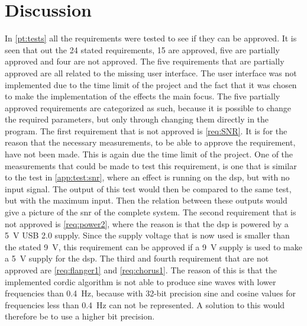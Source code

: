 \section{Discussion}\label{sec:discussion}

In \autoref{pt:tests} all the requirements were tested to see if they can be approved. It is seen that out the 24 stated requirements, 15 are approved, five are partially approved and four are not approved. 
The five requirements that are partially approved are all related to the missing user interface. The user interface was not implemented due to the time limit of the project and the fact that it was chosen to make the implementation of the effects the main focus. The five partially approved requirements are categorized as such, because it is possible to change the required parameters, but only through changing them directly in the program. The first requirement that is not approved is \autoref{req:SNR}. It is for the reason that the necessary measurements, to be able to approve the requirement, have not been made. This is again due the time limit of the project. One of the measurements that could be made to test this requirement, is one that is similar to the test in \autoref{app:test:snr}, where an effect is running on the \gls{dsp}, but with no input signal. The output of this test would then be compared to the same test, but with the maximum input. Then the relation between these outputs would give a picture of the \gls{snr} of the complete system.
The second requirement that is not approved is \autoref{req:power2}, where the reason is that the \gls{dsp} is powered by a \SI{5}{\volt} USB 2.0 supply. Since the supply voltage that is now used is smaller than the stated \SI{9}{\volt}, this requirement can be approved if a \SI{9}{\volt} supply is used to make a \SI{5}{\volt} supply for the \gls{dsp}.
The third and fourth requirement that are not approved are \autoref{req:flanger1} and \autoref{req:chorus1}. The reason of this is that the implemented \gls{cordic} algorithm is not able to produce sine waves with lower frequencies than \SI{0.4}{\hertz}, because with 32-bit precision sine and cosine values for frequencies less than \SI{0.4}{\hertz} can not be represented. A solution to this would therefore be to use a higher bit precision. \\


